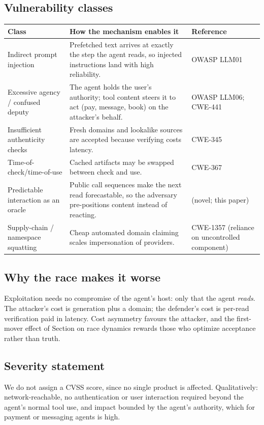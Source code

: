 \documentclass[11pt]{article}
\begin{document}
\subsection{Vulnerability classes}
\begin{center}
\begin{tabular}{p{4.2cm}p{7.6cm}p{3cm}}
\hline
Class & How the mechanism enables it & Reference\\ \hline
Indirect prompt injection & Prefetched text arrives at exactly the step the agent reads, so injected
  instructions land with high reliability. & OWASP LLM01\\
Excessive agency / confused deputy & The agent holds the user's authority; tool content steers it to act
  (pay, message, book) on the attacker's behalf. & OWASP LLM06; CWE-441\\
Insufficient authenticity checks & Fresh domains and lookalike sources are accepted because verifying
  costs latency. & CWE-345\\
Time-of-check/time-of-use & Cached artifacts may be swapped between check and use. & CWE-367\\
Predictable interaction as an oracle & Public call sequences make the next read forecastable, so the
  adversary pre-positions content instead of reacting. & (novel; this paper)\\
Supply-chain / namespace squatting & Cheap automated domain claiming scales impersonation of providers.
  & CWE-1357 (reliance on uncontrolled component)\\ \hline
\end{tabular}
\end{center}

\subsection{Why the race makes it worse}
Exploitation needs no compromise of the agent's host: only that the agent \emph{reads}. The attacker's cost is
generation plus a domain; the defender's cost is per-read verification paid in latency. Cost asymmetry
favours the attacker, and the first-mover effect of Section on race dynamics rewards those who
optimize acceptance rather than truth.

\subsection{Severity statement}
We do not assign a CVSS score, since no single product is affected. Qualitatively: network-reachable, no
authentication or user interaction required beyond the agent's normal tool use, and impact bounded by the
agent's authority, which for payment or messaging agents is high.
\end{document}
